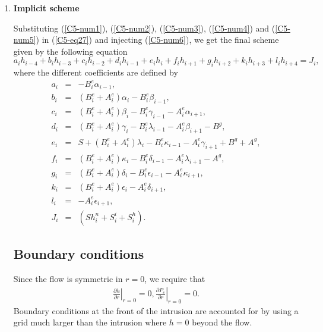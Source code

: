 \begin{enumerate}
 
\item \textbf{Implicit scheme}
 
  Substituting   (\ref{C5-num1}),  (\ref{C5-num2}),   (\ref{C5-num3}),
  (\ref{C5-num4}) and (\ref{C5-num5}) in (\ref{C5-eq27}) and injecting
  (\ref{C5-num6}),  we get  the final  scheme given  by the  following
  equation
  \begin{equation}
    a_ih_{i-4}+b_ih_{i-3}+c_ih_{i-2}+d_ih_{i-1}+e_ih_i+f_ih_{i+1}+g_ih_{i+2}+k_ih_{i+3}+l_ih_{i+4}=J_i,
    \label{C5-eqd3}
  \end{equation}
  where the different coefficients are defined by
  \begin{eqnarray}
    a_i&=&-B_i^{e}\alpha_{i-1} ,\\
    b_i&=&(B_i^{e}+A_i^{e})\alpha_{i}-B_i^{e}\beta_{i-1} ,\\
    c_i&=&(B_i^{e}+A_i^{e})\beta_{i}-B_i^{e}\gamma_{i-1}-A_i^{e}\alpha_{i+1} ,\\
    d_i&=&(B_i^{e}+A_i^{e})\gamma_{i}-B_i^{e}\lambda_{i-1}-A_i^{e}\beta_{i+1} -B^{g},\\
    e_i&=&S+(B_i^{e}+A_i^{e})\lambda_{i}-B_i^{e}\kappa_{i-1}-A_i^{e}\gamma_{i+1} +B^{g}+A^{g},\\
    f_i&=&(B_i^{e}+A_i^{e})\kappa_{i}-B_i^{e}\delta_{i-1}-A_i^{e}\lambda_{i+1} - A^{g},\\
    g_i&=&(B_i^{e}+A_i^{e})\delta_{i}-B_i^{e}\epsilon_{i-1}-A_i^{e}\kappa_{i+1} ,\\
    k_i&=&(B_i^{e}+A_i^{e})\epsilon_{i}-A_i^{e}\delta_{i+1} ,\\
    l_i&=&-A_i^{e}\epsilon_{i+1} ,\\
    J_i&=&(Sh_i^n+ S^{i}_{i}+S^{h}_{i}).
  \end{eqnarray}	
  \subsection{Boundary conditions}
	
  Since the flow is symmetric in $r=0$, we require that
  \begin{eqnarray}
    \left.\frac{\partial h}{\partial r}\right|_{r=0}=0,
    \left.\frac{\partial P_{e}}{\partial r}\right|_{r=0}=0.
  \end{eqnarray}
  Boundary conditions at the front  of the intrusion are accounted for
  by using  a grid much larger  than the intrusion where  $h=0$ beyond
  the flow.


\end{enumerate}
